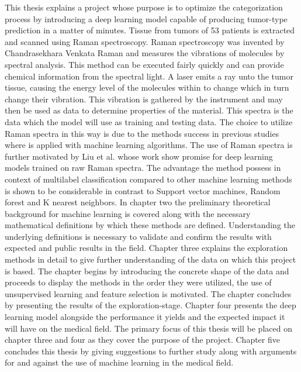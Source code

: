 This thesis explains a project whose purpose is to optimize the categorization process by introducing a deep learning model capable of producing tumor-type prediction in a matter of minutes. Tissue from tumors of 53 patients is extracted and scanned using Raman spectroscopy. Raman spectroscopy was invented by Chandrasekhara Venkata Raman and measures the vibrations of molecules by spectral analysis. This method can be executed fairly quickly and can provide chemical information from the spectral light. A laser emits a ray unto the tumor tissue, causing the energy level of the molecules within to change which in turn change their vibration. This vibration is gathered by the instrument and may then be used as data to determine properties of the material\cite{long1977raman}\cite{graves1989practical}. This spectra is the data which the model will use as training and testing data. The choice to utilize Raman spectra in this way is due to the methods success in previous studies where is applied with machine learning algorithms\cite{ramanDL}\cite{ho2019rapid}. The use of Raman spectra is further motivated by Liu et al.\cite{liu2017deep} whose work show promise for deep learning models trained on raw Raman spectra. The advantage the method possess in context of multilabel classification compared to other machine learning methods is shown to be considerable in contrast to Support vector machines, Random forest and K nearest neighbors\cite{liu2017deep}. In chapter two the preliminary theoretical background for machine learning is covered along with the necessary mathematical definitions by which these methods are defined. Understanding the underlying definitions is necessary to validate and confirm the results with expected and public results in the field. Chapter three explains the exploration methods in detail to give further understanding of the data on which this project is based. The chapter begins by introducing the concrete shape of the data and proceeds to display the methods in the order they were utilized, the use of unsupervised learning and feature selection is motivated. The chapter concludes by presenting the results of the exploration-stage. Chapter four presents the deep learning model alongside the performance it yields and the expected impact it will have on the medical field. The primary focus of this thesis will be placed on chapter three and four as they cover the purpose of the project. Chapter five concludes this thesis by giving suggestions to further study along with arguments for and against the use of machine learning in the medical field.


